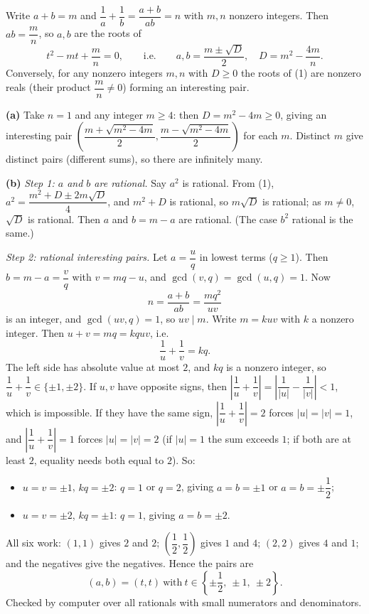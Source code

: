 Write $a+b=m$ and $\dfrac{1}{a}+\dfrac{1}{b}=\dfrac{a+b}{ab}=n$ with $m,n$ nonzero integers. Then $ab=\dfrac {m}{n}$, so $a,b$ are the roots of
\[
t^2-mt+\dfrac {m}{n}=0,\qquad\text{i.e.}\qquad a,b=\dfrac{m\pm\sqrt D}{2},\quad D=m^2-\dfrac{4m}{n}. \tag{1}
\]
Conversely, for any nonzero integers $m,n$ with $D\ge0$ the roots of (1) are nonzero reals (their product $\dfrac {m}{n}\ne0$) forming an interesting pair.

\textbf{(a)} Take $n=1$ and any integer $m\ge4$: then $D=m^2-4m\ge0$, giving an interesting pair $\left(\dfrac{m+\sqrt{m^2-4m}}{2},\dfrac{m-\sqrt{m^2-4m}}{2}\right)$ for each $m$. Distinct $m$ give distinct pairs (different sums), so there are infinitely many.

\textbf{(b)} \emph{Step 1: $a$ and $b$ are rational.} Say $a^2$ is rational. From (1), $a^2=\dfrac{m^2+D\pm2m\sqrt D}{4}$, and $m^2+D$ is rational, so $m\sqrt D$ is rational; as $m\ne0$, $\sqrt D$ is rational. Then $a$ and $b=m-a$ are rational. (The case $b^2$ rational is the same.)

\emph{Step 2: rational interesting pairs.} Let $a=\dfrac {u}{q}$ in lowest terms ($q\ge1$). Then $b=m-a=\dfrac {v}{q}$ with $v=mq-u$, and $\gcd(v,q)=\gcd(u,q)=1$. Now
\[
n=\dfrac{a+b}{ab}=\dfrac{mq^2}{uv}
\]
is an integer, and $\gcd(uv,q)=1$, so $uv\mid m$. Write $m=kuv$ with $k$ a nonzero integer. Then $u+v=mq=kquv$, i.e.
\[
\dfrac{1}{u}+\dfrac{1}{v}=kq. \tag{2}
\]
The left side has absolute value at most $2$, and $kq$ is a nonzero integer, so $\dfrac{1}{u}+\dfrac{1}{v}\in\{\pm1,\pm2\}$. If $u,v$ have opposite signs, then $\left|\dfrac{1}{u}+\dfrac{1}{v}\right|=\left|\dfrac{1}{|u|}-\dfrac{1}{|v|}\right|<1$, which is impossible. If they have the same sign, $\left|\dfrac{1}{u}+\dfrac{1}{v}\right|=2$ forces $|u|=|v|=1$, and $\left|\dfrac{1}{u}+\dfrac{1}{v}\right|=1$ forces $|u|=|v|=2$ (if $|u|=1$ the sum exceeds $1$; if both are at least $2$, equality needs both equal to $2$). So:
\begin{itemize}
\item $u=v=\pm1$, $kq=\pm2$: $q=1$ or $q=2$, giving $a=b=\pm1$ or $a=b=\pm\dfrac{1}{2}$;
\item $u=v=\pm2$, $kq=\pm1$: $q=1$, giving $a=b=\pm2$.
\end{itemize}
All six work: $(1,1)$ gives $2$ and $2$; $\left(\dfrac{1}{2},\dfrac{1}{2}\right)$ gives $1$ and $4$; $(2,2)$ gives $4$ and $1$; and the negatives give the negatives. Hence the pairs are
\[
\boxed{(a,b)=(t,t)\ \text{with}\ t\in\left\{\pm\dfrac{1}{2},\ \pm1,\ \pm2\right\}}.
\]
Checked by computer over all rationals with small numerators and denominators.
